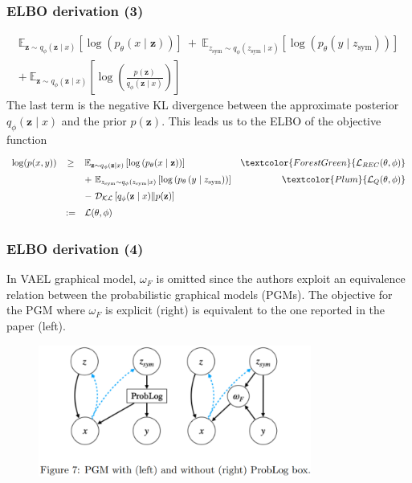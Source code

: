 \documentclass[10pt,xcolor={dvipsnames}]{beamer}
\begin{document}
\begin{frame}
    \frametitle{ELBO derivation (3)}
    \begin{multline*}
        \mathbb{E}_{\mathbf{z} \sim q_{\phi}(\mathbf{z} \mid x)}\left[\log \left(p_{\theta}(x \mid \mathbf{z})\right)\right] ~
        + ~ \mathbb{E}_{z_{\text {sym}} \sim q_{\phi}\left(z_{\text {sym}} \mid x\right)}\left[\log \left(p_{\theta}\left(y \mid z_{\text {sym}}\right)\right)\right]\\
        + ~ \mathbb{E}_{\mathbf{z} \sim q_{\phi}(\mathbf{z} \mid x)}\left[\log \left(\frac{p(\mathbf{z})}{q_{\phi}(\mathbf{z} \mid x)}\right)\right]
    \end{multline*}
    The last term is the negative KL divergence between the approximate posterior $q_{\phi}(\mathbf{z} \mid x)$ and the prior $p(\mathbf{z})$.
    This leads us to the ELBO of the objective function
    $$
    \def\arraystretch{1.5}
    \begin{array}{lclr}
        \log (p(x, y)) & \geq & \mathbb{E}_{\mathbf{z} \sim q_{\phi}(\mathbf{z} \mid x)}\left[\log \left(p_{\theta}(x \mid \mathbf{z})\right)\right] & \textcolor{ForestGreen}{\mathcal{L}_{R E C}(\theta, \phi)}\\
        & & + ~ \mathbb{E}_{z_{\text {sym}} \sim q_{\phi}\left(z_{\text {sym}} \mid x\right)}\left[\log \left(p_{\theta}\left(y \mid z_{\text {sym}}\right)\right)\right] & \textcolor{Plum}{\mathcal{L}_{Q}(\theta, \phi)}\\
        & & - ~ \mathcal{D}_{\mathcal{K} \mathcal{L}}\left[q_{\phi}(\mathbf{z} \mid x) \| p(\mathbf{z})\right] \\
        & :=  & \mathcal{L}(\theta, \phi)
    \end{array}
    $$
\end{frame}


\begin{frame}
    \frametitle{ELBO derivation (4)}
    In VAEL graphical model, $\omega_{F}$ is omitted since the authors exploit an equivalence relation between the probabilistic graphical models (PGMs). The objective for the PGM where $\omega_{F}$ is explicit (right) is equivalent to the one reported in the paper (left).

    \begin{figure}[htb]
        \centering
        \includegraphics[width=0.8\textwidth]{figures/pgms.png}
    \end{figure}
\end{frame}
\end{document}
